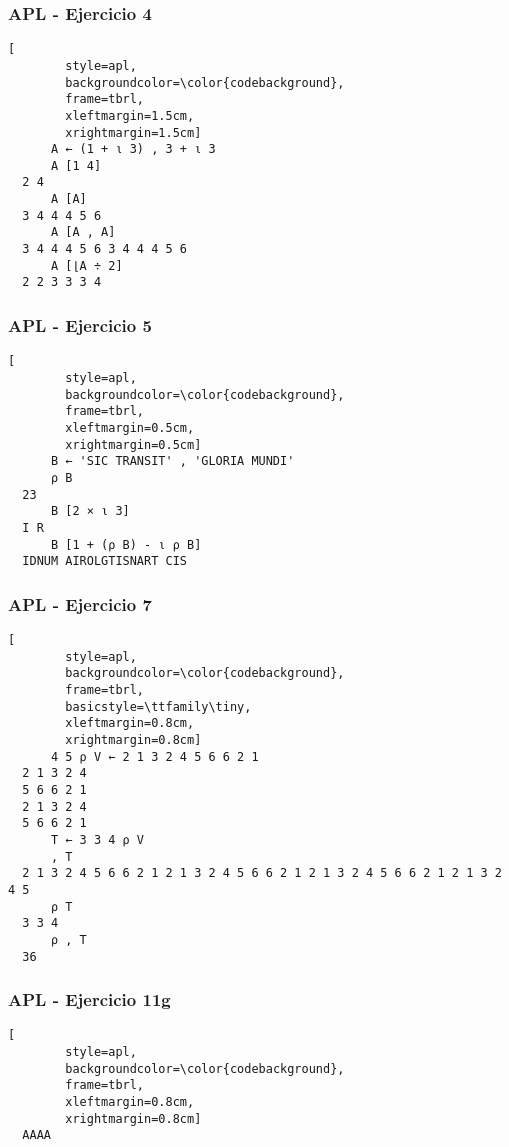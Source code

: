 \documentclass{beamer}
\begin{document}
\begin{frame}[fragile]
  \frametitle{APL - Ejercicio 4}

  \begin{center}
      \begin{lstlisting}[
        style=apl,
        backgroundcolor=\color{codebackground},
        frame=tbrl,
        xleftmargin=1.5cm,
        xrightmargin=1.5cm]
      A ← (1 + ⍳ 3) , 3 + ⍳ 3
      A [1 4]
  2 4
      A [A]
  3 4 4 4 5 6
      A [A , A]
  3 4 4 4 5 6 3 4 4 4 5 6
      A [⌊A ÷ 2]
  2 2 3 3 3 4
      \end{lstlisting}
  \end{center}
\end{frame}

\begin{frame}[fragile]
  \frametitle{APL - Ejercicio 5}

  \begin{center}
      \begin{lstlisting}[
        style=apl,
        backgroundcolor=\color{codebackground},
        frame=tbrl,
        xleftmargin=0.5cm,
        xrightmargin=0.5cm]
      B ← 'SIC TRANSIT' , 'GLORIA MUNDI'
      ⍴ B
  23
      B [2 × ⍳ 3]
  I R
      B [1 + (⍴ B) - ⍳ ⍴ B]
  IDNUM AIROLGTISNART CIS
      \end{lstlisting}
  \end{center}
\end{frame}

\begin{frame}[fragile]
  \frametitle{APL - Ejercicio 7}

  \begin{center}
      \begin{lstlisting}[
        style=apl,
        backgroundcolor=\color{codebackground},
        frame=tbrl,
        basicstyle=\ttfamily\tiny,
        xleftmargin=0.8cm,
        xrightmargin=0.8cm]
      4 5 ⍴ V ← 2 1 3 2 4 5 6 6 2 1
  2 1 3 2 4
  5 6 6 2 1
  2 1 3 2 4
  5 6 6 2 1
      T ← 3 3 4 ⍴ V
      , T
  2 1 3 2 4 5 6 6 2 1 2 1 3 2 4 5 6 6 2 1 2 1 3 2 4 5 6 6 2 1 2 1 3 2 4 5
      ⍴ T
  3 3 4
      ⍴ , T
  36
      \end{lstlisting}
  \end{center}
\end{frame}

\begin{frame}[fragile]
  \frametitle{APL - Ejercicio 11g}

  \begin{center}


      \begin{lstlisting}[
        style=apl,
        backgroundcolor=\color{codebackground},
        frame=tbrl,
        xleftmargin=0.8cm,
        xrightmargin=0.8cm]
  AAAA
      \end{lstlisting}
  \end{center}
\end{frame}
\end{document}
